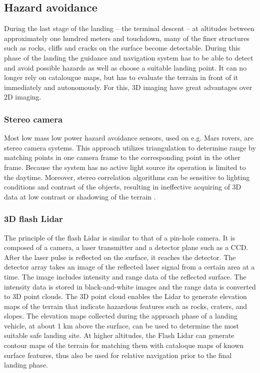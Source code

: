 \subsection{Hazard avoidance}

During the last stage of the landing – the terminal descent – at altitudes between approximately one hundred meters and touchdown, many of the finer structures such as rocks, cliffs and cracks on the surface become detectable. During this phase of the landing the guidance and navigation system has to be able to detect and avoid possible hazards as well as choose a suitable landing point. It can no longer rely on catalougue maps, but has to evaluate the terrain in front of it immediately and autonomously. For this, 3D imaging have great advantages over 2D imaging. 



\subsubsection{Stereo camera}
Most low mass low power hazard avoidance sensors, used on e.g. Mars rovers, are stereo camera systems. This approach utilizes triangulation to determine range by matching points in one camera frame to the corresponding point in the other frame. Because the system has no active light source its operation is limited to the daytime. Moreover, stereo correlation algorithms can be sensitive to lighting conditions and contrast of the objects, resulting in ineffective acquiring of 3D data at low contrast or shadowing of the terrain \cite{structuredlight}.
 

\subsubsection{3D flash Lidar}

The principle of the flash Lidar is similar to that of a pin-hole camera. It is composed of a camera, a laser transmitter and a detector plane such as a CCD. After the laser pulse is reflected on the surface, it reaches the detector. The detector array takes an image of the reflected laser signal from a certain area at a time. The image includes intensity and range data of the reflected surface. The intensity data is stored in black-and-white images and the range data is converted to 3D point clouds.
The 3D point cloud enables the Lidar to generate elevation maps of the terrain that indicate hazardous features such as rocks, craters, and slopes. The elevation maps collected during the approach phase of a landing vehicle, at about 1 km above the surface, can be used to determine the most suitable safe landing site. At higher altitudes, the Flash Lidar can generate contour maps of the terrain for matching them with cataloque maps of known surface features, thus also be used for relative navigation prior to the final landing phase.

